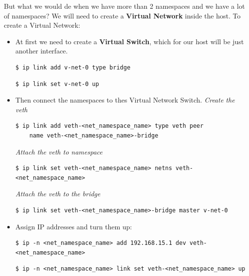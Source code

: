 \documentclass{article}
\newenvironment{codetemplate}[1][]{%
  \mybasecolorbox[#1]
  \itshape
}{%
  \endmybasecolorbox
}
\begin{document}
But what we would de when we have more than 2 namespaces and we have a lot of namespaces? We will need to create a \textbf{Virtual Network} inside the host. To create a Virtual Network:
\begin{itemize}
    \item At first we need to create a \textbf{Virtual Switch}, which for our host will be just another interface.
\begin{codetemplate}{}
\begin{verbatim}
$ ip link add v-net-0 type bridge
\end{verbatim}
\end{codetemplate}
\begin{codetemplate}{}
\begin{verbatim}
$ ip link set v-net-0 up
\end{verbatim}
\end{codetemplate}
    \item Then connect the namespaces to thes Virtual Network Switch.
\begin{codetemplate}{Create the veth}
\begin{verbatim}
$ ip link add veth-<net_namespace_name> type veth peer 
    name veth-<net_namespace_name>-bridge
\end{verbatim}
\end{codetemplate}
\begin{codetemplate}{Attach the veth to namespace}
\begin{verbatim}
$ ip link set veth-<net_namespace_name> netns veth-<net_namespace_name>
\end{verbatim}
\end{codetemplate}
\begin{codetemplate}{Attach the veth to the bridge}
\begin{verbatim}
$ ip link set veth-<net_namespace_name>-bridge master v-net-0
\end{verbatim}
\end{codetemplate}
    \item Assign IP addresses and turn them up:
\begin{codetemplate}{}
\begin{verbatim}
$ ip -n <net_namespace_name> add 192.168.15.1 dev veth-<net_namespace_name>
\end{verbatim}
\end{codetemplate}
\begin{codetemplate}{}
\begin{verbatim}
$ ip -n <net_namespace_name> link set veth-<net_namespace_name> up
\end{verbatim}
\end{codetemplate}
\end{itemize}
\end{document}
